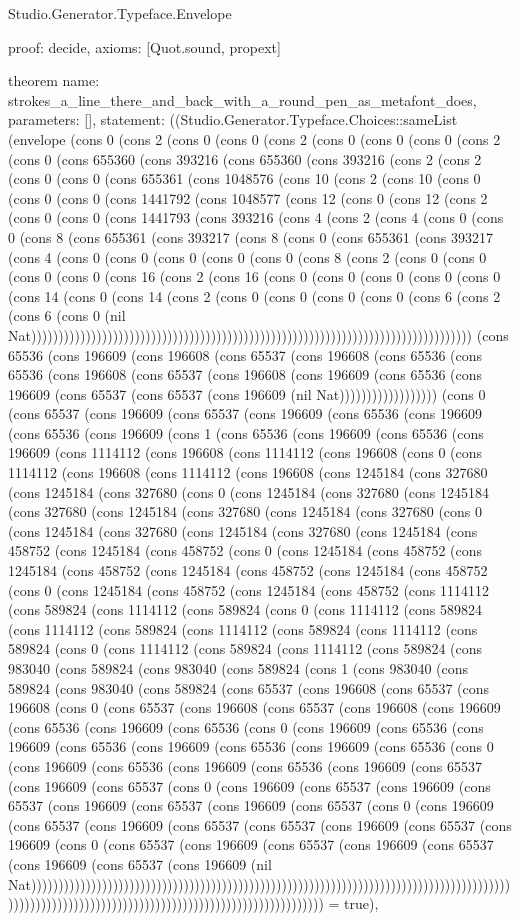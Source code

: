 \begin{lexlean}{Studio.Generator.Typeface.Envelope}
\begin{semanticmodule}
{  proof: decide{},
  axioms: [Quot.sound, propext]
}

theorem{
  name: strokes_a_line_there_and_back_with_a_round_pen_as_metafont_does,
  parameters: [],
  statement: ((Studio.Generator.Typeface.Choices::sameList (envelope (cons 0 (cons 2 (cons 0 (cons 0 (cons 2 (cons 0 (cons 0 (cons 0 (cons 2 (cons 0 (cons 655360 (cons 393216 (cons 655360 (cons 393216 (cons 2 (cons 2 (cons 0 (cons 0 (cons 655361 (cons 1048576 (cons 10 (cons 2 (cons 10 (cons 0 (cons 0 (cons 0 (cons 1441792 (cons 1048577 (cons 12 (cons 0 (cons 12 (cons 2 (cons 0 (cons 0 (cons 1441793 (cons 393216 (cons 4 (cons 2 (cons 4 (cons 0 (cons 0 (cons 8 (cons 655361 (cons 393217 (cons 8 (cons 0 (cons 655361 (cons 393217 (cons 4 (cons 0 (cons 0 (cons 0 (cons 0 (cons 0 (cons 8 (cons 2 (cons 0 (cons 0 (cons 0 (cons 0 (cons 16 (cons 2 (cons 16 (cons 0 (cons 0 (cons 0 (cons 0 (cons 0 (cons 14 (cons 0 (cons 14 (cons 2 (cons 0 (cons 0 (cons 0 (cons 0 (cons 6 (cons 2 (cons 6 (cons 0 (nil Nat))))))))))))))))))))))))))))))))))))))))))))))))))))))))))))))))))))))))))))))))) (cons 65536 (cons 196609 (cons 196608 (cons 65537 (cons 196608 (cons 65536 (cons 65536 (cons 196608 (cons 65537 (cons 196608 (cons 196609 (cons 65536 (cons 196609 (cons 65537 (cons 65537 (cons 196609 (nil Nat)))))))))))))))))) (cons 0 (cons 65537 (cons 196609 (cons 65537 (cons 196609 (cons 65536 (cons 196609 (cons 65536 (cons 196609 (cons 1 (cons 65536 (cons 196609 (cons 65536 (cons 196609 (cons 1114112 (cons 196608 (cons 1114112 (cons 196608 (cons 0 (cons 1114112 (cons 196608 (cons 1114112 (cons 196608 (cons 1245184 (cons 327680 (cons 1245184 (cons 327680 (cons 0 (cons 1245184 (cons 327680 (cons 1245184 (cons 327680 (cons 1245184 (cons 327680 (cons 1245184 (cons 327680 (cons 0 (cons 1245184 (cons 327680 (cons 1245184 (cons 327680 (cons 1245184 (cons 458752 (cons 1245184 (cons 458752 (cons 0 (cons 1245184 (cons 458752 (cons 1245184 (cons 458752 (cons 1245184 (cons 458752 (cons 1245184 (cons 458752 (cons 0 (cons 1245184 (cons 458752 (cons 1245184 (cons 458752 (cons 1114112 (cons 589824 (cons 1114112 (cons 589824 (cons 0 (cons 1114112 (cons 589824 (cons 1114112 (cons 589824 (cons 1114112 (cons 589824 (cons 1114112 (cons 589824 (cons 0 (cons 1114112 (cons 589824 (cons 1114112 (cons 589824 (cons 983040 (cons 589824 (cons 983040 (cons 589824 (cons 1 (cons 983040 (cons 589824 (cons 983040 (cons 589824 (cons 65537 (cons 196608 (cons 65537 (cons 196608 (cons 0 (cons 65537 (cons 196608 (cons 65537 (cons 196608 (cons 196609 (cons 65536 (cons 196609 (cons 65536 (cons 0 (cons 196609 (cons 65536 (cons 196609 (cons 65536 (cons 196609 (cons 65536 (cons 196609 (cons 65536 (cons 0 (cons 196609 (cons 65536 (cons 196609 (cons 65536 (cons 196609 (cons 65537 (cons 196609 (cons 65537 (cons 0 (cons 196609 (cons 65537 (cons 196609 (cons 65537 (cons 196609 (cons 65537 (cons 196609 (cons 65537 (cons 0 (cons 196609 (cons 65537 (cons 196609 (cons 65537 (cons 65537 (cons 196609 (cons 65537 (cons 196609 (cons 0 (cons 65537 (cons 196609 (cons 65537 (cons 196609 (cons 65537 (cons 196609 (cons 65537 (cons 196609 (nil Nat)))))))))))))))))))))))))))))))))))))))))))))))))))))))))))))))))))))))))))))))))))))))))))))))))))))))))))))))))))))))))))))))))))))))))))))))))) = true),
}
\end{semanticmodule}
\end{lexlean}
